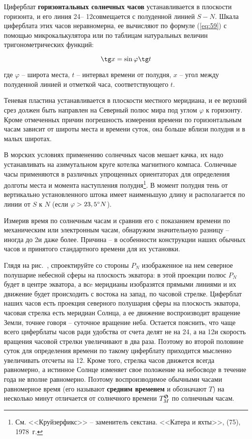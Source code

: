 Циферблат \textbf{горизонтальных солнечных часов} устанавливается в
плоскости горизонта, и его линия 24\thr \--- 12\thr совмещается с
полуденной линией $S-N$. Шкала циферблата этих часов неравномерна, ее
вычисляют по формуле (\ref{eq:59}) с помощью микрокалькулятора или по
таблицам натуральных величин тригонометрических функций:

\begin{equation}
  \tg x = \sin \varphi \tg t \label{eq:59}
\end{equation}

где $\varphi$ \--- широта места, $t$ \--- интервал времени от полудня,
$x$ \--- угол между полуденной линией и отметкой часа,
соответствующего $t$.

Теневая пластина устанавливается в плоскости местного меридиана, и ее
верхний срез должен быть направлен на Северный полюс мира под углом
$\varphi$ к горизонту. Кроме отмеченных причин погрешность измерения
времени по горизонтальным часам зависит от широты места и времени
суток, она больше вблизи полудня и в малых широтах.

В морских условиях применению солнечных часов мешает качка, их надо
устанавливать на азимутальном круге котелка магнитного
компаса. Солнечные часы применяются в различных упрощенных
ориентаторах для определения долготы места и момента наступления
полудня\footnote{См. <<Круйзерфикс>> \--- заменитель
  секстана. <<Катера и яхты>>,  (75), 1978~г.}. В момент полудня
тень от вертикально установленного штока имеет наименьшую длину и
располагается по линии от $S$ к $N$ (если $\varphi > 23,5^\circ N$).

Измерив время по солнечным часам и сравнив его с показанием времени по
механическим или электронным часам, обнаружим значительную разницу
\--- иногда до 2\thr и даже более. Причина \--- в особенности
конструкции наших обычных часов и принятого стандартного времени для
их установки.

Глядя на рис.~, спроектируйте со стороны $P_N$ изображенное на
нем северное полушарие небесной сферы на плоскость экватора: в этой
проекции полюс $P_N$ будет в центре экватора, а всe меридианы
изобразятся прямыми линиями и их движение будет происходить с востока
на запад, по часовой стрелке. Циферблат наших часов есть проекция
северного полушария сферы на плоскость экватора, часовая стрелка есть
меридиан Солнца, а ее движение воспроизводит вращение Земли, точнее
говоря \--- суточное вращение неба. Остается пояснить, что чаще всего
циферблаты часов ради удобства от счета делят не на 24\thr, а на
12\thr и скорость вращения часовой стрелки увеличивают в два
раза. Поэтому во второй половине суток для определения времени по
такому циферблату приходится мысленно увеличивать отсчеты на
12\thr. Кроме того, стрелка часов движется всегда равномерно, а
истинное Солнце изменяет свое положение на небосводе в течение года не
вполне равномерно. Поэтому воспроизводимое обычными часами равномерное
время (его называют \textbf{средним временем} и обозначают $T$) на
несколько минут отличается от солнечного времени $\TSun_M$ по
солнечным часам.

